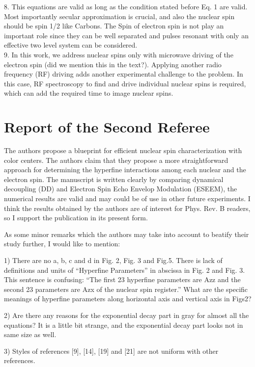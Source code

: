 \documentclass[12pt]{amsart}
\begin{document}
	8. This equations are valid as long as the condition stated before Eq. 1 are valid. Most importantly secular approximation is crucial, and also the nuclear spin should be spin 1/2 like Carbons. The Spin of electron spin is not play an important role since they can be well separated and pulses resonant with only an effective two level system can be considered.\\
	
	9. In this work, we address nuclear spins only with microwave driving of the electron spin (did we mention this in the text?). Applying another radio frequency (RF) driving adds another experimental challenge to the problem. In this case, RF spectroscopy to find and drive individual nuclear spins is required, which can add the required time to image nuclear spins.\\

	\color{red} \section{ Report of the Second Referee}
	The authors propose a blueprint for efficient nuclear spin
	characterization with color centers. The authors claim that they
	propose a more straightforward approach for determining the hyperfine
	interactions among each nuclear and the electron spin. The manuscript
	is written clearly by comparing dynamical decoupling (DD) and Electron
	Spin Echo Envelop Modulation (ESEEM), the numerical results are valid
	and may could be of use in other future experiments. I think the
	results obtained by the authors are of interest for Phys. Rev. B
	readers, so I support the publication in its present form.
	
	As some minor remarks which the authors may take into account to
	beatify their study further, I would like to mention:
	
	1) There are no a, b, c and d in Fig. 2, Fig. 3 and Fig.5. There is
	lack of definitions and units of “Hyperfine Parameters” in abscissa in
	Fig. 2 and Fig. 3. This sentence is confusing: “The first 23 hyperfine
	parameters are Azz and the second 23 parameters are Azx of the nuclear
	spin register.” What are the specific meanings of hyperfine parameters
	along horizontal axis and vertical axis in Figs2?
	
	2) Are there any reasons for the exponential decay part in gray for
	almost all the equations? It is a little bit strange, and the
	exponential decay part looks not in same size as well.
	
	3) Styles of references [9], [14], [19] and [21] are not uniform with
	other references.
	
\end{document}
